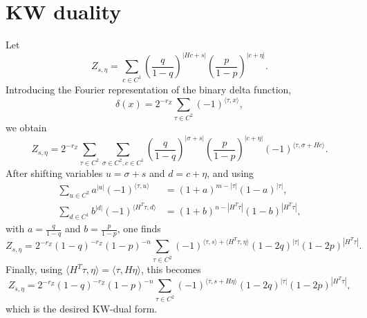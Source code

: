 \documentclass[twoside,english,aps,showpacs,pra,superscriptaddress]{revtex4-2}
\begin{document}
\section{KW duality}
Let
\begin{equation}\label{eq:Zseta-csum}
Z_{s,\eta}
=\sum_{c\in C^1}
\left(\frac{q}{1-q}\right)^{|Hc+s|}
\left(\frac{p}{1-p}\right)^{|c+\eta|}.
\end{equation}
Introducing the Fourier representation of the binary delta function,
\begin{equation}\label{eq:binary-delta}
\delta(x)=2^{-r_Z}\sum_{\tau\in C^2}(-1)^{\langle \tau,x\rangle},
\end{equation}
we obtain
\begin{equation}\label{eq:Zseta-fourier}
Z_{s,\eta}
=2^{-r_Z}\sum_{\tau\in C^2}\sum_{\sigma\in C^2,c\in C^1}
\left(\frac{q}{1-q}\right)^{|\sigma+s|}
\left(\frac{p}{1-p}\right)^{|c+\eta|}
(-1)^{\langle \tau,\sigma+Hc\rangle}.
\end{equation}
After shifting variables \(u=\sigma+s\) and \(d=c+\eta\), and using
\begin{align}
\sum_{u\in C^2} a^{|u|}(-1)^{\langle \tau,u\rangle}
&=(1+a)^{m-|\tau|}(1-a)^{|\tau|},
\label{eq:hadamard-u}
\\
\sum_{d\in C^1} b^{|d|}(-1)^{\langle H^T\tau,d\rangle}
&=(1+b)^{n-|H^T\tau|}(1-b)^{|H^T\tau|},
\label{eq:hadamard-d}
\end{align}
with \(a=\frac{q}{1-q}\) and \(b=\frac{p}{1-p}\), one finds
\begin{equation}\label{eq:Zseta-dual-intermediate}
Z_{s,\eta}
=
2^{-r_Z}(1-q)^{-r_Z}(1-p)^{-n}
\sum_{\tau\in C^2}
(-1)^{\langle \tau,s\rangle+\langle H^T\tau,\eta\rangle}
(1-2q)^{|\tau|}(1-2p)^{|H^T\tau|}.
\end{equation}
Finally, using \(\langle H^T\tau,\eta\rangle=\langle \tau,H\eta\rangle\), this becomes
\begin{equation}\label{eq:Zseta-KW}
Z_{s,\eta}
=
2^{-r_Z}(1-q)^{-r_Z}(1-p)^{-n}
\sum_{\tau\in C^2}
(-1)^{\langle \tau,s+H\eta\rangle}
(1-2q)^{|\tau|}(1-2p)^{|H^T\tau|},
\end{equation}
which is the desired KW-dual form.
\end{document}
